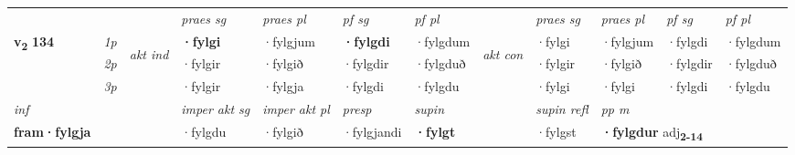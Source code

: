 \begin{longtable}[l]{X>{\footnotesize\itshape}llXXXXlXXXX}
\midrule

 & &   & \textit{praes sg}  & \textit{praes pl}    & \textit{ pf sg} & \textit{pf pl} & & \textit{praes sg}  & \textit{praes pl}    & \textit{pf sg} & \textit{pf pl }  \\ \cmidrule{4-7} \cmidrule{9-12}
 \multirow{2}{*}{{{\textbf{v{\textsubscript{2}}} \Large{\textbf{134}}}}}  & 1p & \multirow{3}{*}{\begin{turn}{90}\textit{akt ind}\end{turn}} & \textbf{·fylgi} & ·fylgjum & \textbf{·fylgdi} & ·fylgdum & \multirow{3}{*}{\begin{turn}{90}\textit{akt con}\end{turn}} &·fylgi & ·fylgjum & ·fylgdi & ·fylgdum\\*
 & 2p &  &  ·fylgir  & ·fylgið & ·fylgdir & ·fylgduð & & ·fylgir & ·fylgið & ·fylgdir & ·fylgduð \\*
 & 3p &  & ·fylgir & ·fylgja & ·fylgdi & ·fylgdu & & ·fylgi & ·fylgi& ·fylgdi & ·fylgdu \\*
\cmidrule{4-7} \cmidrule{9-12}

   {\textit{inf}} & &  & \textit{imper akt sg} & \textit{imper akt pl}   & \textit{presp} & \textit{supin} && \textit{supin refl} & \textit{pp m} \\*
  {\textbf{fram\allowbreak ·fylgja}} & && ·fylgdu  & ·fylgið   & ·fylgjandi &  \textbf{·fylgt} && ·fylgst & \multicolumn{2}{l}{\textbf{·fylgdur} adj\textbf{\textsubscript{2-14}}} \\*

\midrule


\end{longtable}
